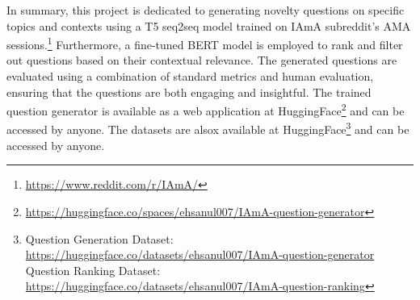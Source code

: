 \documentclass[paper=a4, fontsize=11pt]{scrartcl}
\numberwithin{equation}{section}		%
\numberwithin{figure}{section}			%
\numberwithin{table}{section}				%
\begin{document}
In summary, this project is dedicated to generating novelty questions on specific topics and contexts using a T5 seq2seq model trained on IAmA subreddit's AMA sessions.\footnote{\url{https://www.reddit.com/r/IAmA/}} Furthermore, a fine-tuned BERT model is employed to rank and filter out questions based on their contextual relevance. The generated questions are evaluated using a combination of standard metrics and human evaluation, ensuring that the questions are both engaging and insightful. The trained question generator is available as a web application at HuggingFace\footnote{\url{https://huggingface.co/spaces/ehsanul007/IAmA-question-generator}} and can be accessed by anyone. 
The datasets are alsox available at HuggingFace\footnote{Question Generation Dataset: \url{https://huggingface.co/datasets/ehsanul007/IAmA-question-generator} \\ Question Ranking Dataset: \url{https://huggingface.co/datasets/ehsanul007/IAmA-question-ranking}} and can be accessed by anyone.
\end{document}
